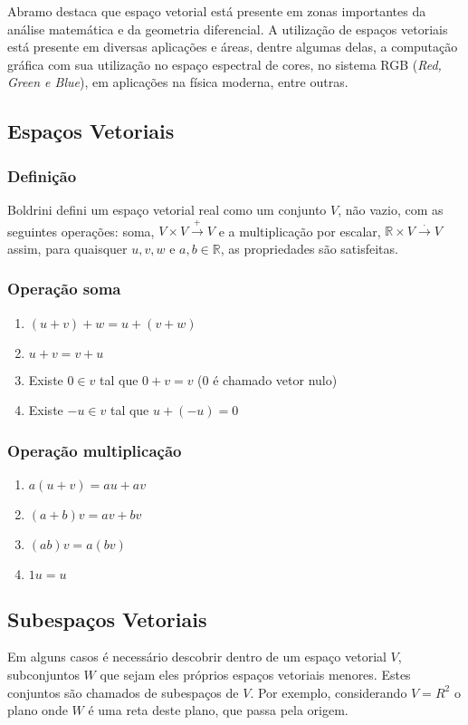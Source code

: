 {{Abramo \cite{2016:Abramo} destaca que espaço vetorial está presente em zonas importantes da análise matemática e da geometria diferencial. A utilização de espaços vetoriais está presente em diversas aplicações e áreas, dentre algumas delas, a computação gráfica com sua utilização no espaço espectral de cores, no sistema RGB (\textit{Red, Green e Blue}), em aplicações na física moderna, entre outras.

\subsection{Espaços Vetoriais}
\subsubsection{Definição}
\noindent Boldrini \cite{1980:Boldrini} defini um espaço vetorial real como um conjunto $V$, não vazio, com as seguintes operações: soma, $V\times V\overset{+}{\rightarrow}V$ e a multiplicação por escalar, $\mathbb{R}\times V\overset{\cdot}{\rightarrow}V$ assim, para quaisquer $u, v, w$ e $a, b \in \mathbb{R}$, as propriedades são satisfeitas.

\subsubsection{Operação soma}
\begin{enumerate}
    \item $(u + v) + w = u + ( v + w)$
    \item $u + v = v + u$
    \item Existe $0 \in v$ tal que $0 + v = v$ (0 é chamado vetor nulo)
    \item Existe $- u \in v$ tal que $u + (-u) = 0$
\end{enumerate}
\subsubsection{Operação multiplicação}
\begin{enumerate}
    \item $a(u + v) = au + av$
    \item $(a + b)v = av + bv$
    \item $(ab)v = a(bv)$
    \item $1u = u$
\end{enumerate}

\subsection{Subespaços Vetoriais}
\noindent Em alguns casos é necessário descobrir dentro de um espaço vetorial $V$, subconjuntos $W$ que sejam eles próprios espaços vetoriais menores. Estes conjuntos são chamados de subespaços de $V$. Por exemplo, considerando $V = R^{2}$ o plano onde $W$ é uma reta deste plano, que passa pela origem.

}}
